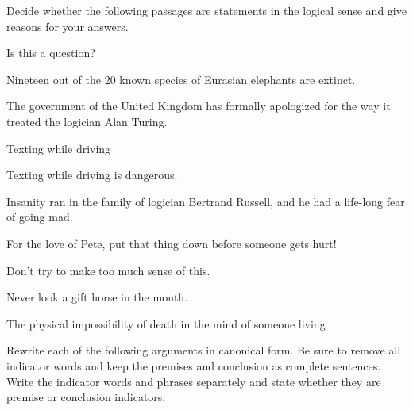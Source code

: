 \noindent\problempart Decide whether the following passages are statements in the logical sense and give reasons for your answers.
\begin{exercises}
\item Is this a question? 
\item Nineteen out of the 20 known species of Eurasian elephants are extinct. 
\item The government of the United Kingdom has formally apologized for the way it treated the logician Alan Turing.  

\item Texting while driving 
\item Texting while driving is dangerous. 
\item Insanity ran in the family of logician Bertrand Russell, and he had a life-long fear of going mad. 
\item For the love of Pete, put that thing down before someone gets hurt!  
\item Don't try to make too much sense of this. 
\item Never look a gift horse in the mouth.  
\item The physical impossibility of death in the mind of someone living  
\end{exercises}

\noindent\problempart Rewrite each of the following arguments in canonical form. Be sure to remove all indicator words and keep the premises and conclusion as complete sentences. Write the indicator words and phrases separately and state whether they are premise or conclusion indicators. 


